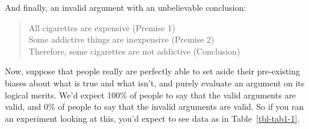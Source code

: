 \documentclass[
  letterpaper,
]{book}
\begin{document}
And finally, an invalid argument with an unbelievable conclusion:

\begin{quote}
All cigarettes are expensive (Premise 1)\\
Some addictive things are inexpensive (Premise 2)\\
Therefore, some cigarettes are not addictive (Conclusion)
\end{quote}

Now, suppose that people really are perfectly able to set aside their
pre-existing biases about what is true and what isn't, and purely
evaluate an argument on its logical merits. We'd expect 100\% of people
to say that the valid arguments are valid, and 0\% of people to say that
the invalid arguments are valid. So if you ran an experiment looking at
this, you'd expect to see data as in Table~\ref{tbl-tab1-1}.

\hypertarget{tbl-tab1-1}{}
 
  \providecommand{\huxb}[2]{\arrayrulecolor[RGB]{#1}\global\arrayrulewidth=#2pt}
  \providecommand{\huxvb}[2]{\color[RGB]{#1}\vrule width #2pt}
  \providecommand{\huxtpad}[1]{\rule{0pt}{#1}}
  \providecommand{\huxbpad}[1]{\rule[-#1]{0pt}{#1}}
\end{document}
